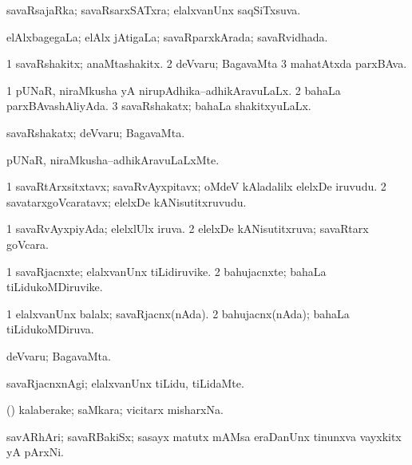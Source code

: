 \bentry
{}
\gl{\gu}
\bmng
savaRsajaRka; savaRsarxSATxra; elalxvanUnx saqSiTxsuva. 
\emng
\eentry

\bentry
{}
\gl{\gu}
\bmng
elAlxbagegaLa; elAlx jAtigaLa; savaRparxkArada; savaRvidhada. 
\emng
\eentry

\bentry
{}
\gl{\nA}
\bmng
\bnum
\num{1} savaRshakitx; anaMtashakitx. 
\num{2} deVvaru; BagavaMta 
\num{3} mahatAtxda parxBAva. 
\enum
\emng
\eentry

\bentry
{}
\gl{\gu}
\bmng
\bnum
\num{1} pUNaR, niraMkusha yA nirupAdhika--adhikAravuLaLx. 
\num{2} bahaLa parxBAvashAliyAda. 
\num{3} savaRshakatx; bahaLa shakitxyuLaLx. 
\enum
\emng

\noindent
\gl{\pagu}
\bmng
{} savaRshakatx; deVvaru; BagavaMta. 
\emng
\eentry

\bentry
{}
\gl{\kirxvi}
\bmng
pUNaR, niraMkusha--adhikAravuLaLxMte. 
\emng
\eentry

\bentry
{}
\gl{\nA}
\bmng
\bnum
\num{1} savaRtArxsitxtavx; savaRvAyxpitavx; oMdeV kAladalilx elelxDe iruvudu. 
\num{2} savatarxgoVcaratavx; elelxDe kANisutitxruvudu. 
\enum
\emng
\eentry

\bentry
{}
\gl{\gu}
\bmng
\bnum
\num{1} savaRvAyxpiyAda; elelxlUlx iruva. 
\num{2} elelxDe kANisutitxruva; savaRtarx goVcara. 
\enum
\emng
\eentry

\bentry
{}
\gl{\nA}
\bmng
\bnum
\num{1} savaRjacnxte; elalxvanUnx tiLidiruvike. 
\num{2} bahujacnxte; bahaLa tiLidukoMDiruvike. 
\enum
\emng
\eentry

\bentry
{}
\gl{\gu}
\bmng
\bnum
\num{1} elalxvanUnx balalx; savaRjacnx(nAda). 
\num{2} bahujacnx(nAda); bahaLa tiLidukoMDiruva. 
\enum
\emng

\noindent
\gl{\pagu}
\bmng
{} deVvaru; BagavaMta. 
\emng
\eentry

\bentry
{}
\gl{\kirxvi}
\bmng
savaRjacnxnAgi; elalxvanUnx tiLidu, tiLidaMte. 
\emng
\eentry

\bentry
{}
\gl{\nA}
\bmng
(\AmA) kalaberake; saMkara; vicitarx misharxNa. 
\emng
\eentry

\bentry
{}
\gl{\nA}
\bmng
savARhAri; savaRBakiSx; sasayx matutx mAMsa eraDanUnx tinunxva vayxkitx yA pArxNi. 
\emng
\eentry

